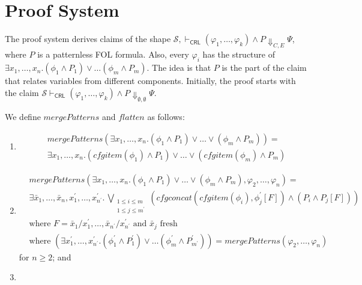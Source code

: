 \documentclass{article}
\newcommand{\CRL}{\mathsf{CRL}}
\begin{document}
\section{Proof System}

The proof system derives claims of the shape
$\mathcal{S}, \vdash_\CRL (\varphi_1, \ldots, \varphi_k) \land P \Downarrow_{C,E} \Psi$,
where $P$ is a patternless FOL formula.
Also, every $\varphi_i$ has the structure of
$\exists x_1,\ldots,x_n. (\phi_1 \land P_1) \lor \ldots (\phi_m \land P_m)$.
The idea is that $P$ is the part of the claim that relates variables from different components.
Initially, the proof starts with the claim
$\mathcal{S} \vdash_\CRL (\varphi_1, \ldots, \varphi_k) \land P \Downarrow_{\emptyset, \emptyset} \Psi$.

\begin{definition}
We define $\mathit{mergePatterns}$ and $\mathit{flatten}$ as follows:
\begin{enumerate}
    \item
    \begin{align*}
     & \mathit{mergePatterns}(\exists x_1,\ldots,x_n. (\phi_1 \land P_1) \lor \ldots \lor (\phi_m \land P_m)) =
     \\ & \exists x_1,\ldots,x_n. (\mathit{cfgitem}(\phi_1) \land P_1) \lor \ldots \lor (\mathit{cfgitem}(\phi_m) \land P_m)
    \end{align*}
    \item
    \begin{align*}
     & \mathit{mergePatterns}(\exists x_1,\ldots,x_n. (\phi_1 \land P_1) \lor \ldots \lor (\phi_m \land P_m), \varphi_2, \ldots, \varphi_n) =
     \\ & \exists \bar{x}_1,\ldots,\bar{x}_n,x_1^\prime,\ldots,x_{n^\prime}^\prime.\,
          \bigvee_{\substack{1 \leq i \leq m\\ 1 \leq j \leq m^\prime}} (\mathit{cfgconcat}(\mathit{cfgitem}(\phi_i), \phi^\prime_j[F]) \land (P_i \land P_j[F]))
     \\ & \mbox{where } F = \bar{x}_1/x^\prime_1,\ldots,\bar{x}_{n^\prime}/x^\prime_{n^\prime}
          \mbox{ and } \bar{x}_j \mbox{ fresh }
     \\ & \mbox{where } (\exists x^\prime_1,\ldots,x^\prime_{n^\prime}. (\phi^\prime_1 \land P^\prime_1) \lor \ldots (\phi^\prime_m \land P^\prime_{m^\prime}))
          = \mathit{mergePatterns}(\varphi_2, \ldots, \varphi_n)
    \end{align*}
    for $n \geq 2$; and
    \item
        \begin{align*}

\end{align*}
\end{enumerate}
\end{definition}
\end{document}
